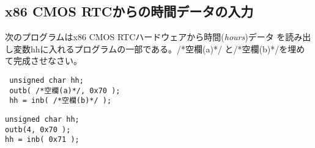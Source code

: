 \documentclass[a4j,9pt]{jsarticle}
\begin{document}
\subsection{x86 CMOS RTCからの時間データの入力}
\begin{screen}
 次のプログラムはx86 CMOS RTCハードウェアから時間({\itshape hours})データ
 を読み出し変数{\ttfamily hh}に入れるプログラムの一部である。/*空欄(a)*/
 と/*空欄(b)*/を埋めて完成させなさい。
 \begin{lstlisting}
 unsigned char hh;
 outb( /*空欄(a)*/, 0x70 );
 hh = inb( /*空欄(b)*/ );
 \end{lstlisting}
\end{screen}

\begin{lstlisting}
unsigned char hh;
outb(4, 0x70 );
hh = inb( 0x71 );
\end{lstlisting}
\end{document}
